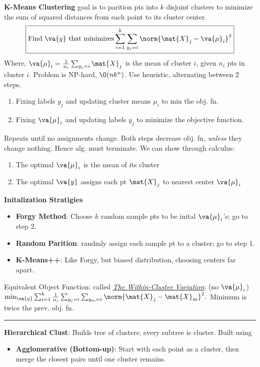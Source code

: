 \documentclass[10pt,landscape]{article}
\newcommand{\ruler}{\vspace{-0.4em}\noindent\rule{\linewidth}{0.25pt}\par}
\begin{document}
\begin{multicols*}{3}
    \textbf{K-Means Clustering} goal is to parition pts into $k$ disjoint clusters to minimize the sum of squared distances from each point to its cluster center.
    \[
        \boxed{\text{Find } \va{y} \text{ that minimizes} \sum_{i = 1}^{k} \sum_{y_j = i} \norm{\mat{X}_j - \va{\mu}_i}^2}
    \]
    Where, $\va{\mu}_i = \frac{1}{n_i} \sum_{y_j = i} \mat{X}_j$ is the mean of cluster $i$, given $n_i$ pts in cluster $i$.
    Problem is NP-hard, $\O(nk^n)$. Use heuristic, alternating between 2 steps.
    \begin{enumerate}
        \item Fixing labels $y_j$ and updating cluster means $\mu_i$ to min the obj\@. fn.
        \item Fixing $\va{\mu}_i$ and updating labels $y_j$ to minimize the objective function.
    \end{enumerate}
    Repeats until no assignments change. Both steps decrease obj\@. fn, \textit{unless} they change nothing. Hence alg\@. must terminate. We can show through calculus:
    \begin{enumerate}
        \item The optimal $\va{\mu}_i$ is the mean of its cluster
        \item The optimal $\va{y}$ assigns each pt $\mat{X}_j$ to nearest center $\va{\mu}_i$
    \end{enumerate}
    \textbf{Initalization Stratigies}
    \begin{itemize}
        \item \textbf{Forgy Method}: Choose $k$ random sample pts to be inital $\va{\mu}_i$'s; go to step 2.
        \item \textbf{Random Parition}: randmly assign each sample pt to a cluster; go to step 1.
        \item \textbf{K-Means++}: Like Forgy, but biased distribution, choosing centers far apart.
    \end{itemize}
    Equivalent Object Function: called \underline{\textit{The Within-Cluster Variation}}: (no $\va{\mu}_i$)
    $
        \min_{\va{y}} \sum_{i = 1}^{k} \frac{1}{n_i} \sum_{y_j = i} \sum_{y_m = i} \norm{\mat{X}_j - \mat{X}_m}^2.
    $
    Minimum is twice the  prev\@. obj\@. fn\@.
    \ruler%
    \textbf{Hierarchical Clust}: Builds tree of clusters; every subtree is cluster. Built using
    \begin{itemize}[label=\textbullet]
        \item \textbf{Agglomerative (Bottom-up)}: Start with each point as a cluster, then merge the closest pairs until one cluster remains.

\end{itemize}
\end{multicols*}
\end{document}
